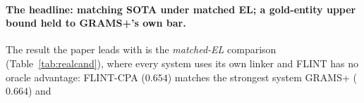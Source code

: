 
\paragraph{The headline: matching SOTA under matched EL; a gold-entity upper bound held to GRAMS+'s own bar.}
The result the paper leads with is the \emph{matched-EL} comparison
(Table~\ref{tab:realcand}), where every system uses its own linker and FLINT has no
oracle advantage: FLINT-CPA ($0.654$) matches the strongest system GRAMS+ ($0.664$) and
